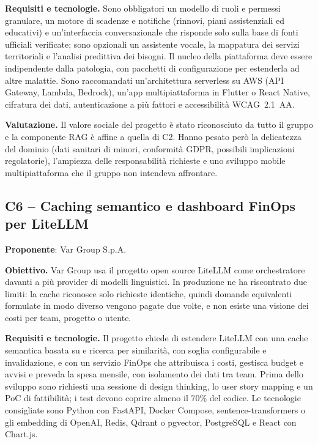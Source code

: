 \textbf{Requisiti e tecnologie.} Sono obbligatori un modello di ruoli e
permessi granulare, un motore di scadenze e notifiche (rinnovi, piani
assistenziali ed educativi) e un'interfaccia conversazionale  che
risponde solo sulla base di fonti ufficiali verificate; sono opzionali un
assistente vocale, la mappatura dei servizi territoriali e l'analisi
predittiva dei bisogni. Il nucleo della piattaforma deve essere
indipendente dalla patologia, con pacchetti di configurazione per
estenderla ad altre malattie. Sono raccomandati un'architettura serverless
su AWS (API Gateway, Lambda, Bedrock), un'app multipiattaforma in Flutter o
React Native, cifratura dei dati, autenticazione a più fattori e
accessibilità WCAG~2.1~AA.

\textbf{Valutazione.} Il valore sociale del progetto è stato riconosciuto
da tutto il gruppo e la componente RAG è affine a quella di C2. Hanno
pesato però la delicatezza del dominio (dati sanitari di minori,
conformità GDPR, possibili implicazioni regolatorie), l'ampiezza delle
responsabilità richieste e uno sviluppo mobile multipiattaforma che il
gruppo non intendeva affrontare.

\subsection{C6 -- Caching semantico e dashboard FinOps per LiteLLM}
\textbf{Proponente}: Var Group S.p.A.

\textbf{Obiettivo.} Var Group usa il progetto open source LiteLLM come
orchestratore davanti a più provider di modelli linguistici. In produzione
ne ha riscontrato due limiti: la cache riconosce solo richieste identiche,
quindi domande equivalenti formulate in modo diverso vengono pagate due
volte, e non esiste una visione dei costi per team, progetto o utente.

\textbf{Requisiti e tecnologie.} Il progetto chiede di estendere LiteLLM
con una cache semantica basata su  e ricerca per
similarità, con soglia configurabile e invalidazione, e con un servizio
FinOps che attribuisca i costi, gestisca budget e avvisi e preveda la
spesa mensile, con isolamento dei dati tra team. Prima dello sviluppo sono
richiesti una sessione di design thinking, lo user story mapping e un PoC
di fattibilità; i test devono coprire almeno il 70\% del codice. Le
tecnologie consigliate sono Python con FastAPI, Docker Compose,
sentence-transformers o gli embedding di OpenAI, Redis, Qdrant o
pgvector, PostgreSQL e React con Chart.js.


